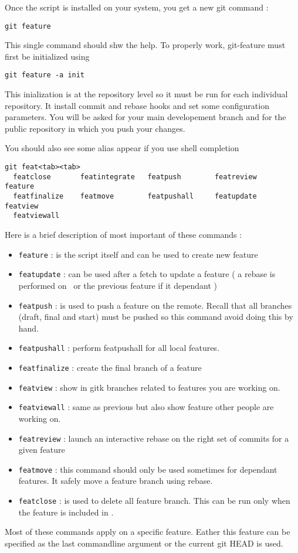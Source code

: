 Once the script is installed on your system, you get a new git command :
\begin{lstlisting}
git feature
\end{lstlisting}
This single command should shw the help. To properly work, git-feature must first be initialized using
\begin{lstlisting}
git feature -a init
\end{lstlisting}
This inialization is at the repository level so it must be run for each individual repository. It install commit and rebase hooks and set some configuration parameters. You will be asked for your main developement branch and for the public repository in which you push your changes.

You should also see some alias appear if you use shell completion
\begin{lstlisting}
git feat<tab><tab>
  featclose       featintegrate   featpush        featreview      feature
  featfinalize    featmove        featpushall     featupdate      featview        
  featviewall     
\end{lstlisting}
Here is a brief description of most important of these commands :
\begin{itemize}
    \item \texttt{feature} : is the script itself and can be used to create new feature
    \item \texttt{featupdate} : can be used after a fetch to update a feature ( a rebase is performed on \DEVREF~or the previous feature if it dependant )
    \item \texttt{featpush} : is used to push a feature on the remote. Recall that all branches (draft, final and start) must be pushed so this command avoid doing this by hand.
    \item \texttt{featpushall} : perform featpushall for all local features.
    \item \texttt{featfinalize} : create the final branch of a feature
    \item \texttt{featview} : show in gitk branches related to features you are working on.
    \item \texttt{featviewall} : same as previous but also show feature other people are working on.
    \item \texttt{featreview} : launch an interactive rebase on the right set of commits for a given feature
    \item \texttt{featmove} : this command should only be used sometimes for dependant features. It safely move a feature branch using rebase.
    \item \texttt{featclose} : is used to delete all feature branch. This can be run only when the feature is included in \DEVREF.
\end{itemize}
Most of these commands apply on a specific feature. Eather this feature can be specified as the last commandline argument or the current git HEAD is used.

